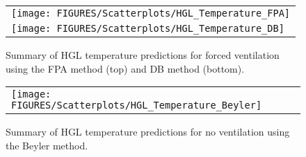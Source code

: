 \begin{figure}[p]
\begin{center}
\begin{tabular}{l}
\texttt{[image: FIGURES/Scatterplots/HGL\_Temperature\_FPA]} \\
\texttt{[image: FIGURES/Scatterplots/HGL\_Temperature\_DB]}
\end{tabular}
\end{center}
\caption[Summary of HGL temperature predictions for forced ventilation.]
{Summary of HGL temperature predictions for forced ventilation using the FPA method (top) and DB method (bottom).}
\label{HGL_Summary_Forced_Ventilation}
\end{figure}

\begin{figure}[p]
\begin{center}
\begin{tabular}{l}
\texttt{[image: FIGURES/Scatterplots/HGL\_Temperature\_Beyler]}
\end{tabular}
\end{center}
\caption[Summary of HGL temperature predictions for no ventilation.]
{Summary of HGL temperature predictions for no ventilation using the Beyler method.}
\label{HGL_Summary_No_Ventilation}
\end{figure}

